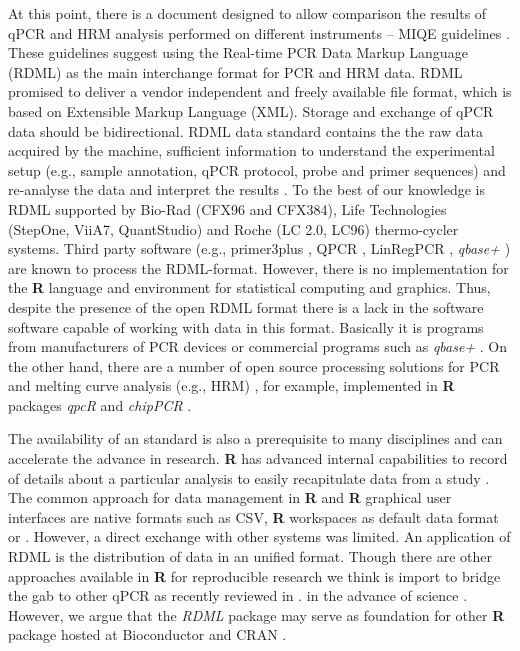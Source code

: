 \documentclass{bioinfo}
\begin{document}
At this point, there is a document designed to allow comparison the results of 
qPCR and HRM analysis performed on different instruments -- MIQE guidelines 
\cite{bustin_miqe_2009, huggett_2013}. These guidelines suggest using the 
Real-time PCR Data Markup Language (RDML) as the main interchange format for PCR 
and HRM data. RDML promised to deliver a vendor independent and freely available 
file format, which is based on Extensible Markup Language (XML). Storage and 
exchange of qPCR data should be bidirectional. RDML data standard contains the 
the raw data acquired by the machine, sufficient information to understand the 
experimental setup (e.g., sample annotation, qPCR protocol, probe and primer 
sequences) and re-analyse the data and interpret the results 
\cite{lefever_rdml:_2009}. To the best of our knowledge is RDML  supported by 
Bio-Rad (CFX96 and CFX384), Life Technologies (StepOne, ViiA7, QuantStudio) and 
Roche (LC 2.0, LC96) thermo-cycler systems. Third party software (e.g., 
primer3plus \cite{untergasser_2007}, QPCR \cite{pabinger_2009}, LinRegPCR 
\cite{ruijter_2014}, \textit{qbase+} \cite{hellemans_2007}) are known to process 
the RDML-format. However, there is no implementation for the \textbf{R} language 
and environment for statistical computing and graphics. Thus, despite the 
presence of the open RDML format there is a lack in the software software 
capable of working with data in this format. Basically it is programs from 
manufacturers of PCR devices or commercial programs such as \textit{qbase+} 
\cite{rdml}. On the other hand, there are a number of open source processing 
solutions for PCR and melting curve analysis (e.g., HRM) 
\cite{roediger_RJ_2013,cousins_2012}, for example, implemented in \textbf{R} 
packages \textit{qpcR}\cite{ritz_qpcr:_2008} and \textit{chipPCR} 
\cite{roediger_chippcr_2014}.

The availability of an standard is also a prerequisite to many disciplines and 
can accelerate the advance in research. \textbf{R} has advanced internal 
capabilities to record of details about a particular analysis to easily 
recapitulate data from a study \cite{liu_2014}. The common approach for data 
management in \textbf{R} and \textbf{R} graphical user interfaces are native 
formats such as CSV, \textbf{R} workspaces as default data format or 
\cite{rodiger_rkward_2012, pabinger_2014, RDCT2014c}. However, a direct exchange 
with other systems was limited. An application of RDML is the distribution of 
data in an unified format. Though there are other approaches available in 
\textbf{R} for reproducible research \cite{Leeper_2014} we think is import to 
bridge the gab to other qPCR as recently reviewed in \cite{pabinger_2014}. in 
the advance of science \cite{gentleman_2004}. However, we argue that the 
\textit{RDML} package may serve as foundation for other \textbf{R} package 
hosted at Bioconductor \cite{gentleman_2004} and CRAN \cite{RCT}.
\end{document}
